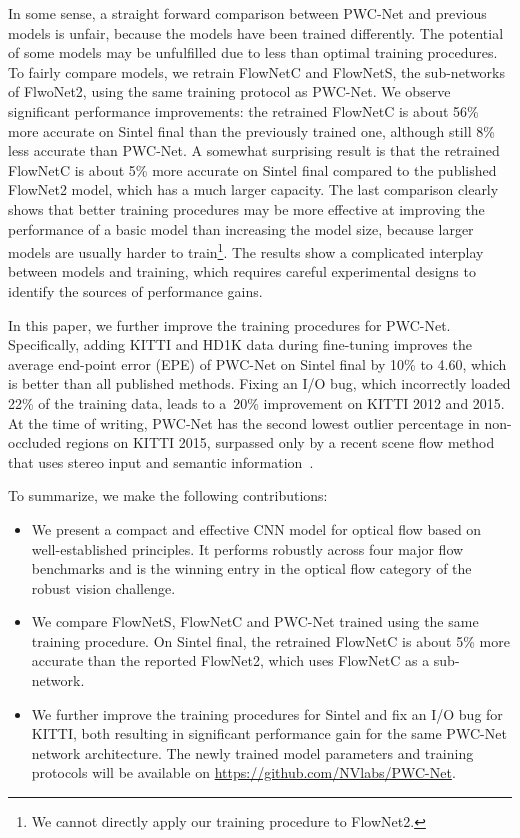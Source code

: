 \documentclass[10pt,journal,cspaper,compsoc]{IEEEtran}
\begin{document}
	In some sense, a straight forward comparison between PWC-Net and previous models is unfair, because the models have been trained differently. The potential of some models may be unfulfilled due to less than optimal training procedures. 
	To  fairly compare models, we retrain FlowNetC and FlowNetS, the sub-networks of FlwoNet2, using the same training protocol as PWC-Net. We observe significant performance improvements: the retrained FlowNetC is about 56\% more accurate on Sintel final than the previously trained one, although still 8\% less accurate than PWC-Net.
	A somewhat surprising result is that the retrained FlowNetC is about 5\% more accurate on Sintel final compared to the published FlowNet2 model, which has a much larger capacity. The last comparison clearly shows that better training procedures may be more effective at improving the performance of a basic model than increasing the model size, because larger models are usually harder to train\footnote{We cannot directly apply our training procedure to FlowNet2.}.
	The results show a complicated interplay between models and training, which requires careful experimental designs to identify the sources of performance gains.
	
	In this paper, we further improve the training procedures for PWC-Net. Specifically, adding KITTI and HD1K data during fine-tuning improves the average end-point error (EPE) of PWC-Net on Sintel final by 10\% to 4.60, which is better than all published methods. Fixing an I/O bug, which incorrectly loaded 22\% of the training data, leads to a~20\% improvement on KITTI 2012 and 2015. At the time of writing, PWC-Net has the second lowest outlier percentage in non-occluded regions on KITTI 2015,  surpassed only by a recent scene flow method that uses stereo input and semantic information~\cite{Behl2017ICCV}. 
	
	To summarize, we make the following contributions:
	\begin{itemize}
\item We present a compact and effective CNN model for optical flow based on well-established principles. It performs robustly across four major flow benchmarks and is the winning entry in the optical flow category of the robust vision challenge. 
\item We compare FlowNetS, FlowNetC and PWC-Net trained using the same training procedure.  On Sintel final, the retrained FlowNetC is about 5\% more accurate than  the reported FlowNet2, which uses FlowNetC as a sub-network.
\item We further improve the training procedures for Sintel and fix an I/O bug for KITTI, both resulting in significant performance gain for the same PWC-Net network architecture. The newly trained model parameters and training protocols will be available on \url{https://github.com/NVlabs/PWC-Net}.
	\end{itemize}
\end{document}
